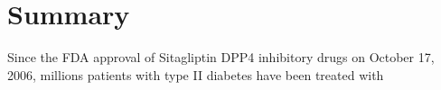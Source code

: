 \section{\label{chap:Sum} Summary}
Since the FDA approval of Sitagliptin DPP4 inhibitory drugs on October 17, 2006, millions patients with type II diabetes have been treated with 
